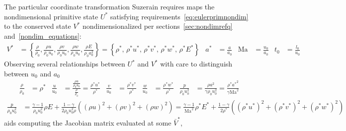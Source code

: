 \documentclass[letterpaper,11pt,nointlimits,reqno,draft]{amsart}
\newcommand{\Mach}[1][]{\ensuremath{\mbox{Ma}_{#1}}}
\begin{document}
The particular coordinate transformation Suzerain requires maps the
nondimensional primitive state $U^*$ satisfying
requirements~\eqref{eq:eulerprimnondim} to the conserved state $V^*$
nondimensionalized per sections~\ref{sec:nondimrefq}
and~\ref{nondim_equations}:
\begin{align}
\label{eq:eulerconsnondim}
V^{*}
&= \left\{
  \frac{\rho}{\rho_0},
  \frac{\rho u}{\rho_0 u_0},
  \frac{\rho v}{\rho_0 u_0},
  \frac{\rho w}{\rho_0 u_0},
  \frac{\rho E}{\rho_0 a_0^2}
\right\}
= \left\{
    \rho^{*},
  \,\rho^{*} u^{*},
  \,\rho^{*} v^{*},
  \,\rho^{*} w^{*},
  \,\rho^{*} E^{*}
\right\}
&
a^{*} &= \frac{a}{a_0}
&
\Mach &= \frac{u_0}{a_0}
&
t_0 &= \frac{l_0}{u_0}
\end{align}
Observing several relationships between $U^*$ and $V^*$ with care to
distinguish between $u_0$ and $a_0$
\begin{align}
  \frac{\rho}{\rho_0} &= \rho^*
&
  \frac{u}{u_0} &=
  \frac{\frac{\rho{}u}{\rho_0u_0}}{\frac{\rho}{\rho_0}}
  =
  \frac{\rho^{*}u^{*}}{\rho^{*}}
&
  \frac{v}{u_0} &= \frac{\rho^{*}v^*}{\rho^*}
&
  \frac{w}{u_0} &= \frac{\rho^{*}w^*}{\rho^*}
&
 \frac{p}{\rho_0 u_0^2} &= \frac{\rho a^2}{\gamma \rho_0 u_0^2}
                         = \frac{\rho^{*} {a^{*}}^2}{\gamma\Mach^2}
\end{align}
\begin{align}
 \frac{p}{\rho_0 u_0^2}
&=
   \frac{\gamma-1}{\rho_0 u_0^2} \rho E
 + \frac{1-\gamma}{2 \rho_0 u_0^2 \rho}\left(
           \left(\rho{}u\right)^2
         + \left(\rho{}v\right)^2
         + \left(\rho{}w\right)^2
   \right)
=
   \frac{\gamma-1}{\Mach^2} \rho^{*} E^{*}
 + \frac{1-\gamma}{2 \rho^{*}}\left(
           \left(\rho^{*}u^{*}\right)^2
         + \left(\rho^{*}v^{*}\right)^2
         + \left(\rho^{*}w^{*}\right)^2
   \right)
\end{align}
aids computing the Jacobian matrix evaluated at some $\bar{V}^{*}$,
\end{document}

